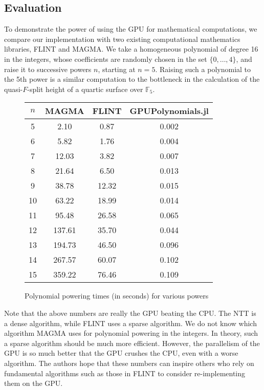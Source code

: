 \subsection{Evaluation}

To demonstrate the power of using the GPU for mathematical computations, 
we compare our implementation
with two existing computational mathematics libraries, FLINT
and MAGMA.
We take a homogeneous polynomial of degree 16 in the integers,
whose coefficients are randomly chosen in the set 
\(\{0, \ldots, 4\}\), and raise it to successive powers \(n\),
starting at \(n=5\).
Raising such a polynomial to the 5th power is a similar 
computation to the bottleneck in the calculation of the
quasi-\(F\)-split height of a quartic surface over \(\mathbb{F}_{5}\).

\begin{figure}[h]
\begin{center}
\begin{tabular}{|c|c|c|c|}
    \hline
    \(n\) & MAGMA & FLINT & GPUPolynomials.jl \\
    \hline
    5 & 2.10 &    0.87 &  0.002 \\
    \hline                      
    6 & 5.82 &    1.76 &  0.004 \\
    \hline                      
    7 & 12.03 &   3.82 &  0.007 \\
    \hline                      
    8 & 21.64 &   6.50 &  0.013 \\
    \hline                      
    9 & 38.78 &   12.32 & 0.015 \\
    \hline                      
    10 & 63.22 &  18.99 & 0.014 \\
    \hline                      
    11 & 95.48 &  26.58 & 0.065 \\
    \hline                      
    12 & 137.61 & 35.70 & 0.044 \\
    \hline                      
    13 & 194.73 & 46.50 & 0.096 \\
    \hline                          
    14 & 267.57 & 60.07 & 0.102\\
    \hline                          
    15 & 359.22 & 76.46 & 0.109\\
    \hline
\end{tabular}
\caption{Polynomial powering times (in seconds) for various powers}
\end{center}
\end{figure}

Note that the above numbers are really the GPU beating the CPU.
The NTT is a dense algorithm, while FLINT uses a sparse algorithm.
We do not know which algorithm MAGMA uses for polynomial powering
in the integers.
In theory, such a sparse algorithm should
be much more efficient.
However, the parallelism of the GPU is so much better that the
GPU crushes the CPU, even with a worse algorithm.
The authors hope that these numbers can inspire others who
rely on fundamental algorithms such as those in FLINT to 
consider re-implementing them on the GPU.

